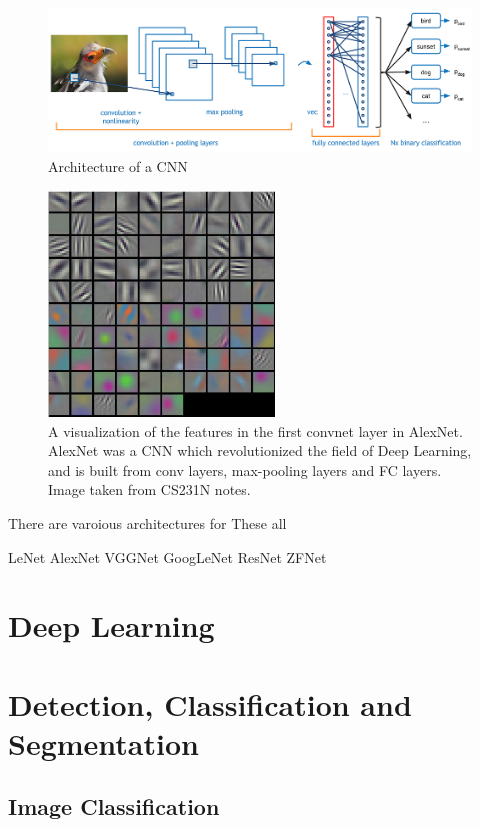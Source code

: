 \begin{figure}[!ht]
    \centering
    \includegraphics[width=150mm, keepaspectratio]{figures/convnet.png}
    \caption{Architecture of a CNN}
    \label{fig:convnet}
\end{figure}

\begin{figure}[!ht]
    \centering
    \includegraphics[width=60mm, keepaspectratio]{figures/filters.png}
    \caption{A visualization of the features in the first convnet layer in AlexNet\cite{NIPS2012_4824}. AlexNet was a CNN which revolutionized the field of Deep Learning, and is built from conv layers, max-pooling layers and FC layers. Image taken from CS231N notes.}
    \label{fig:filters}
\end{figure}

There are varoious architectures for 
These all 

LeNet
AlexNet
VGGNet
GoogLeNet
ResNet
ZFNet


\section{Deep Learning}

\section{Detection, Classification and Segmentation}
\subsection{Image Classification}
